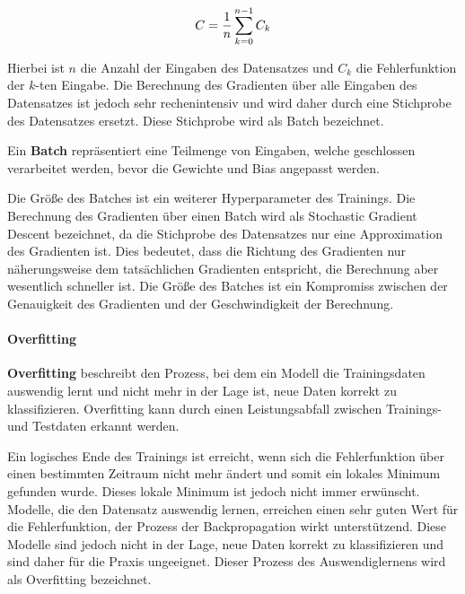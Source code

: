 \begin{equation}
    C = \frac{1}{n}\sum_{k=0}^{n-1}C_k\\
\end{equation}

Hierbei ist $n$ die Anzahl der Eingaben des Datensatzes und $C_k$ die Fehlerfunktion der $k$-ten Eingabe.
Die Berechnung des Gradienten über alle Eingaben des Datensatzes ist jedoch sehr rechenintensiv und wird daher durch eine Stichprobe des Datensatzes ersetzt.
Diese Stichprobe wird als Batch bezeichnet.\\

\begin{definition}\label{def:batch}
    Ein \textbf{Batch} repräsentiert eine Teilmenge von Eingaben, welche geschlossen verarbeitet werden, bevor die Gewichte und Bias angepasst werden.
\end{definition}

Die Größe des Batches ist ein weiterer Hyperparameter des Trainings.
Die Berechnung des Gradienten über einen Batch wird als Stochastic Gradient Descent bezeichnet, da die Stichprobe des Datensatzes nur eine Approximation des Gradienten ist.
Dies bedeutet, dass die Richtung des Gradienten nur näherungsweise dem tatsächlichen Gradienten entspricht, die Berechnung aber wesentlich schneller ist.
Die Größe des Batches ist ein Kompromiss zwischen der Genauigkeit des Gradienten und der Geschwindigkeit der Berechnung.\\

\paragraph{Overfitting}
\begin{definition}\label{def:overfitting}
    \textbf{Overfitting} beschreibt den Prozess, bei dem ein Modell die Trainingsdaten auswendig lernt und nicht mehr in der Lage ist,
    neue Daten korrekt zu klassifizieren. Overfitting kann durch einen Leistungsabfall zwischen Trainings- und Testdaten erkannt werden.
\end{definition}

Ein logisches Ende des Trainings ist erreicht, wenn sich die Fehlerfunktion über einen bestimmten Zeitraum nicht mehr ändert und somit ein lokales Minimum gefunden wurde.
Dieses lokale Minimum ist jedoch nicht immer erwünscht.
Modelle, die den Datensatz auswendig lernen, erreichen einen sehr guten Wert für die Fehlerfunktion, der Prozess der Backpropagation wirkt unterstützend.
Diese Modelle sind jedoch nicht in der Lage, neue Daten korrekt zu klassifizieren und sind daher für die Praxis ungeeignet.
Dieser Prozess des Auswendiglernens wird als Overfitting bezeichnet.\\

